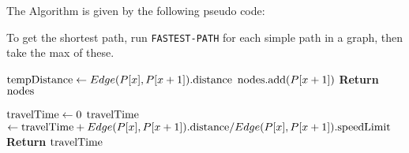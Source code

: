 The Algorithm is given by the following pseudo code:

To get the shortest path, run \texttt{FASTEST-PATH} for each simple path in a graph, then take the max of these.

\begin{algorithm}
\begin{algorithmic}[1]
		\State $\textnormal{tempDistance} \gets Edge(P[x], P[x+1]).\textnormal{distance}$
			\State $\textnormal{nodes.add}(P[x+1])$
		\EndIf	
	\EndFor
	\State \textbf{Return} $\textnormal{nodes}$
\EndProcedure
\end{algorithmic}
\end{algorithm}

\begin{algorithm}
\begin{algorithmic}[1]
  \State $\textnormal{travelTime} \gets 0$ 
    \State $\textnormal{travelTime}$ $\gets \textnormal{travelTime} + Edge(P[x], P[x+1]).\textnormal{distance} / Edge(P[x], P[x+1]).\textnormal{speedLimit}$
  \EndFor
  \State \textbf{Return} $\textnormal{travelTime}$
\EndProcedure
\end{algorithmic}
\end{algorithm}

